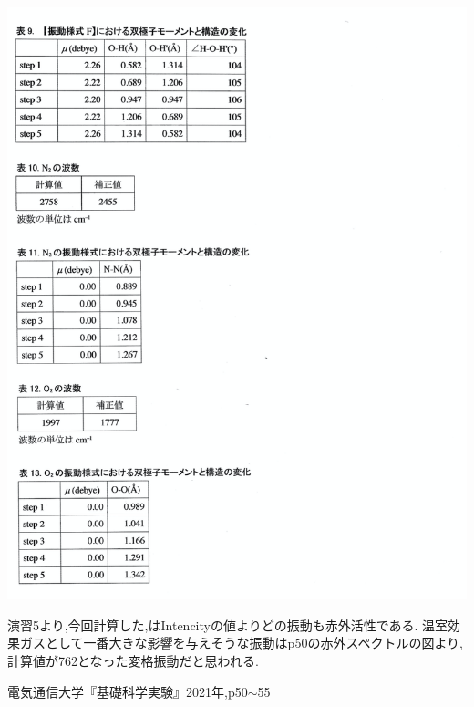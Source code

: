 \documentclass[a4j,10pt,dvipdfmx]{jarticle}
\begin{document}
  \begin{center}
    \includegraphics[width=15cm]{en4-1.png}
  \end{center}

  演習5より,今回計算した,はIntencityの値よりどの振動も赤外活性である.
  温室効果ガスとして一番大きな影響を与えそうな振動は\cite{a}p50の赤外スペクトルの図より,計算値が762となった変格振動だと思われる.
  \begin{thebibliography}{9}
     電気通信大学『基礎科学実験』2021年,p50$\sim$55
  \end{thebibliography}
\end{document}

